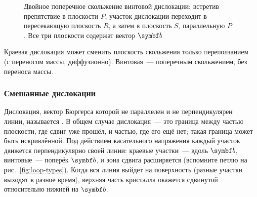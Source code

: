 \begin{figure}[ht]
\centering
{}
\caption{Двойное поперечное скольжение винтовой дислокации: встретив
препятствие в плоскости $P$, участок дислокации переходит в
пересекающую плоскость $R$, а затем в плоскость $S$, параллельную $P$.
Все три плоскости содержат вектор $\vb b$}
\label{fig:cross-slip}
\end{figure}

\begin{glavnoe}
Краевая дислокация может сменить плоскость скольжения только
переползанием (с переносом массы, диффузионно). Винтовая~— поперечным
скольжением, без переноса массы.
\end{glavnoe}

\subsubsection{Смешанные дислокации}

Дислокация, вектор Бюргерса которой не параллелен и не перпендикулярен
линии, называется . В общем случае дислокация~— это
граница между частью плоскости, где сдвиг уже прошёл, и частью, где его
ещё нет; такая граница может быть искривлённой. Под действием
касательного напряжения каждый участок движется перпендикулярно своей
линии: краевые участки~— вдоль $\vb b$, винтовые~— поперёк $\vb b$, и зона
сдвига расширяется (вспомните петлю на рис.~\ref{fig:loop-types}). Когда
вся линия выйдет на поверхность (разные участки выходят в разное время),
верхняя часть кристалла окажется сдвинутой относительно нижней на $\vb b$.

